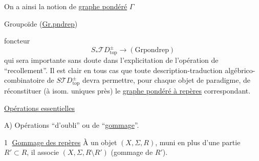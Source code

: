 On a ainsi la notion de \uline{graphe pondéré}   $\Gamma$


Groupoïde (\uline{Gr.pndrep})

foncteur
\[
 S_*\mathcal TD_{\mathrm{top}}^\pm\longrightarrow(\mathrm{Grpondrep})
\]
qui sera importante sans doute dans l'explicitation de l'opération de ``recollement''.
Il est clair en tous cas que toute description-traduction algébrico-combinatoire de
$S\mathcal TD_{\mathrm{top}}^\pm$ devra permettre, pour chaque objet de
 paradigme, de réconstituer (à isom. uniques près) le \uline{graphe pondéré à repères} correspondant.

\uline{Opérations essentielles}

A) Opérations ``d'oubli'' ou de ``\uline{gommage}''.

\textcircled{1} \uline{Gommage des repères} À un objet $(X,\Sigma,R)$, muni en plus d'une partie $R'\subset R$, il associe $(X,\Sigma,R\setminus R')$ (gommage de $R'$).

